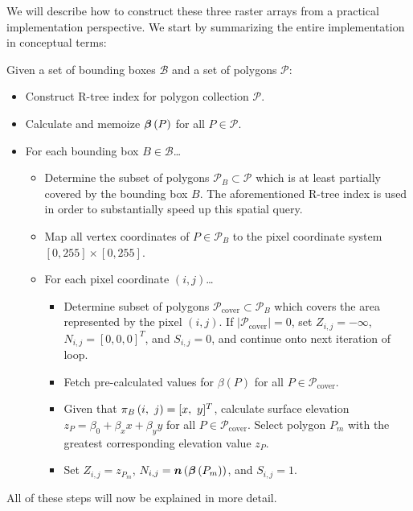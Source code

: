 We will describe how to construct these three raster arrays from a practical implementation perspective.
We start by summarizing the entire implementation in conceptual terms:
\begin{leftbar}
  \noindent
  Given a set of bounding boxes $\mathcal{B}$ and a set of polygons $\mathcal{P}$:
  \begin{itemize}[nosep,leftmargin=*]
    \item Construct R-tree index for polygon collection $\mathcal{P}$.
    \item Calculate and memoize $\boldsymbol{\beta}\left(P\right)$ for all $P \in \mathcal{P}$.
    \item For each bounding box $B \in \mathcal{B}$\ldots
    \begin{itemize}[nosep,leftmargin=0.5cm]
      \item Determine the subset of polygons $\mathcal{P}_B \subset \mathcal{P}$ which is at least partially covered by the bounding box $B$.
        The aforementioned R-tree index is used in order to substantially speed up this spatial query.
      \item Map all vertex coordinates of $P \in \mathcal{P}_B$ to the pixel coordinate system $\left[0, 255\right] \times \left[0, 255\right]$.
      \item For each pixel coordinate $(i, j)$\ldots
      \begin{itemize}[nosep,leftmargin=0.5cm]
        \item Determine subset of polygons $\mathcal{P}_{\mathrm{cover}} \subset \mathcal{P}_B$ which covers the area represented by the pixel $(i, j)$.
          If $|\mathcal{P}_{\mathrm{cover}}| = 0$, set $Z_{i,j} = -\infty$, $N_{i, j} = {[0, 0, 0]}^T$, and $S_{i, j} = 0$, and continue onto next iteration of loop.
        \item Fetch pre-calculated values for $\beta(P)$ for all $P \in \mathcal{P}_{\mathrm{cover}}$.
        \item Given that $\pi_{B}\left(i,~j\right) = [x,~y]^T$, calculate surface elevation $z_P = \beta_0 + \beta_x x + \beta_y y$ for all $P \in \mathcal{P}_{\mathrm{cover}}$.
          Select polygon $P_m$ with the greatest corresponding elevation value $z_P$.
        \item Set $Z_{i,j} = z_{P_m}$, $N_{i, j} = \boldsymbol{n}\left(\boldsymbol{\beta}\left(P_m\right)\right)$, and $S_{i, j} = 1$.
      \end{itemize}
    \end{itemize}
  \end{itemize}
\end{leftbar}
\noindent
All of these steps will now be explained in more detail.

